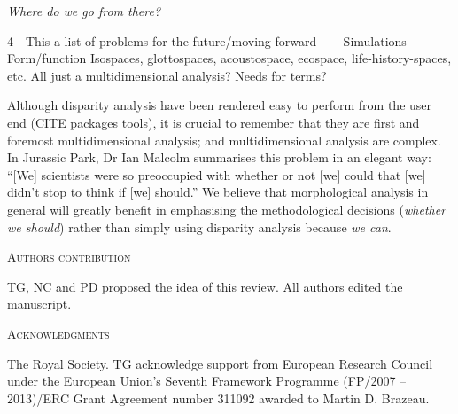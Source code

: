 \documentclass[12pt,letterpaper]{article}
\renewcommand{\section}[1]{%
\bigskip
\begin{center}
\begin{Large}
\normalfont\scshape #1
\medskip
\end{Large}
\end{center}}
\renewcommand{\subsection}[1]{%
\bigskip
\begin{center}
\begin{large}
\normalfont\itshape #1
\end{large}
\end{center}}
\begin{document}
\subsection{Where do we go from there?}
4 - This a list of problems for the future/moving forward
    Simulations 
    Form/function
Isospaces, glottospaces, acoustospace, ecospace, life-history-spaces, etc. All just a multidimensional analysis? Needs for terms?
    



Although disparity analysis have been rendered easy to perform from the user end (CITE packages tools), it is crucial to remember that they are first and foremost multidimensional analysis; and multidimensional analysis are complex.
In Jurassic Park, Dr Ian Malcolm summarises this problem in an elegant way: ``[We] scientists were so preoccupied with whether or not [we] could that [we] didn't stop to think if [we] should.''
We believe that morphological analysis in general will greatly benefit in emphasising the methodological decisions (\textit{whether we should}) rather than simply using disparity analysis because \textit{we can}.





\section{Authors contribution}
TG, NC and PD proposed the idea of this review. All authors edited the manuscript.

\section{Acknowledgments}
The Royal Society.
TG acknowledge support from European Research Council under the European Union's Seventh Framework Programme (FP/2007 – 2013)/ERC Grant Agreement number 311092 awarded to Martin D. Brazeau.




\end{document}
